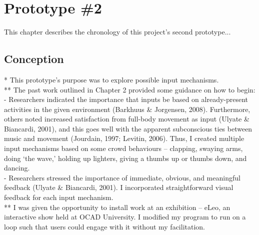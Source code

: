 \chapter{Prototype \#2}

This chapter describes the chronology of this project's second prototype...

\section{Conception}

* This prototype's purpose was to explore possible input mechanisms.\\
** The past work outlined in Chapter 2 provided some guidance on how to begin:\\
- Researchers indicated the importance that inputs be based on already-present activities in the given environment (Barkhuus \& Jorgensen, 2008). Furthermore, others noted increased satisfaction from full-body movement as input (Ulyate \& Biancardi, 2001), and this goes well with the apparent subconscious ties between music and movement (Jourdain, 1997; Levitin, 2006). Thus, I created multiple input mechanisms based on some crowd behaviours -- clapping, swaying arms, doing `the wave,' holding up lighters, giving a thumbs up or thumbs down, and dancing.\\
- Researchers stressed the importance of immediate, obvious, and meaningful feedback (Ulyate \& Biancardi, 2001). I incorporated straightforward visual feedback for each input mechanism.\\
** I was given the opportunity to install work at an exhibition -- eLeo, an interactive show held at OCAD University. I modified my program to run on a loop such that users could engage with it without my facilitation.
